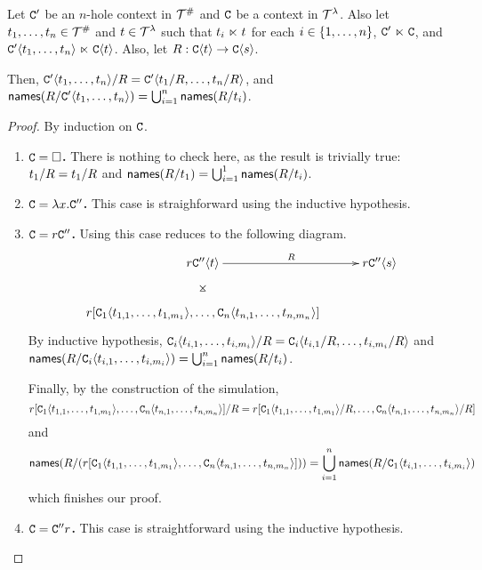\begin{gonzaenv}
\begin{lemma}
Let $\mathtt{C}'$ be an $n$-hole context in $\mathcal{T}^{\mathtt{\#}}$
and $\mathtt{C}$ be a context in $\mathcal{T}^{\lambda}$.
Also let $t_1, \hdots, t_n \in \mathcal{T}^{\mathtt{\#}}$ and $t \in \mathcal{T}^{\lambda}$
such that $t_i \mathrel{\ltimes} t$ for each $i \in \{1, \hdots, n\}$, $\mathtt{C}' \mathrel{\ltimes} \mathtt{C}$,
and $\mathtt{C}'\langle t_1, \hdots, t_n\rangle \mathrel{\ltimes} \mathtt{C}\langle t\rangle$.
Also, let $R : \mathtt{C}\langle t\rangle \to \mathtt{C}\langle s\rangle$.

Then, $\mathtt{C}'\langle t_1, \hdots, t_n\rangle / R = \mathtt{C}'\langle t_1 / R, \hdots, t_n / R\rangle$,
and $\mathsf{names}(R / \mathtt{C}'\langle t_1, \hdots, t_n\rangle) = \bigcup_{i=1}^n \mathsf{names}(R / t_i)$.
\end{lemma}
\begin{proof}
By induction on $\mathtt{C}$.
\begin{enumerate}
  \item {\bf $\mathtt{C} = \Box$.} There is nothing to check here, as the result is trivially true:
    $t_1 / R = t_1 / R$ and $\mathsf{names}(R / t_1) = \bigcup_{i=1}^1 \mathsf{names}(R / t_i)$.
  \item {\bf $\mathtt{C} = \lambda x. \mathtt{C}''$.} This case is straighforward using the inductive hypothesis.
  \item {\bf $\mathtt{C} = r \mathtt{C}''$.} Using  this case reduces to the following diagram.
    \[
    \xymatrix@C=1cm{
      \tmfour \con''\of{\tm} \ar@{}[d]|*=0[@]{\rtimes} \ar[r]^{\redex} & \tmfour \con''\of{\tmtwo} \\
     \tmfour [\con_1\of{\tm_{1,1}, \hdots, \tm_{1, m_1}}, \hdots, \con_n\of{\tm_{n,1}, \hdots, \tm_{n, m_n}}] & \\
    }
    \]
    By inductive hypothesis,
    $\mathtt{C}_i\langle t_{i,1}, \hdots, t_{i, m_i}\rangle / R = \mathtt{C}_i\langle t_{i,1} / R, \hdots, t_{i, m_i} / R\rangle$ and
    $\mathsf{names}(R / \mathtt{C}_i\langle t_{i, 1}, \hdots, t_{i, m_i}\rangle) = \bigcup_{i=1}^n \mathsf{names}(R / t_i)$.

    Finally, by the construction of the simulation,
    \[r [\mathtt{C}_1\langle t_{1,1}, \hdots, t_{1, m_1}\rangle, \hdots, \mathtt{C}_n\langle t_{n,1}, \hdots, t_{n, m_n}\rangle] / R =
     r [\mathtt{C}_1\langle t_{1,1}, \hdots, t_{1, m_1}\rangle / R, \hdots, \mathtt{C}_n\langle t_{n,1}, \hdots, t_{n, m_n}\rangle / R]\]
     and
     \[\mathsf{names}(R / (r [\mathtt{C}_1\langle t_{1,1}, \hdots, t_{1, m_1}\rangle, \hdots, \mathtt{C}_n\langle t_{n,1}, \hdots, t_{n, m_n}\rangle])) = \bigcup_{i=1}^n \mathsf{names}(R / \mathtt{C}_1\langle t_{i,1}, \hdots, t_{i, m_i}\rangle)\]
    which finishes our proof.
  \item {\bf $\mathtt{C} = \mathtt{C}'' r$.} This case is straightforward using the inductive hypothesis.
\end{enumerate}
\end{proof}
\end{gonzaenv}
